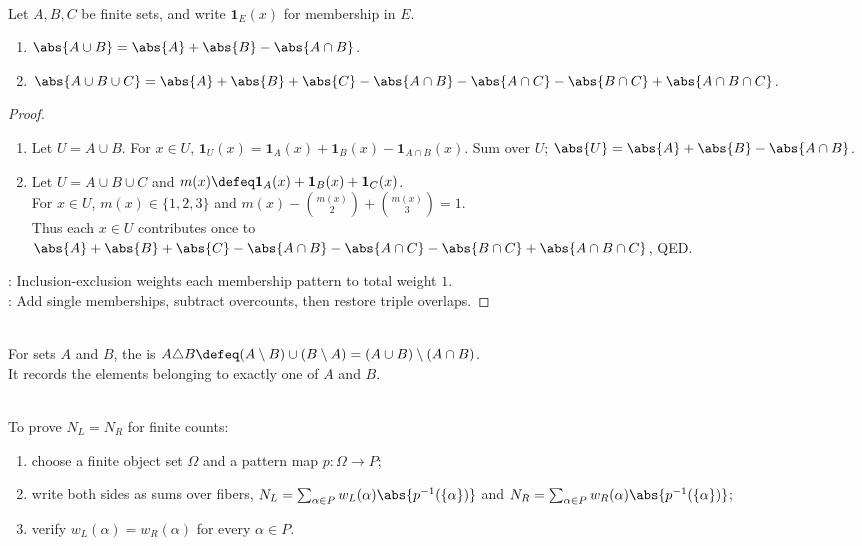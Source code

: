 \begin{proposition} \label{prop:finite-inclusion-exclusion-two-three-sets} \\
Let $A,B,C$ be finite sets, and write $\mathbf{1}_E(x)$ for membership in $E$.
\begin{enumerate}[label=(\roman*)]
\setlength{\itemsep}{0pt}
\item $\abs{A\cup B}=\abs{A}+\abs{B}-\abs{A\cap B}$.
\item $\abs{A\cup B\cup C}=\abs{A}+\abs{B}+\abs{C}-\abs{A\cap B}-\abs{A\cap C}-\abs{B\cap C}+\abs{A\cap B\cap C}$.
\end{enumerate}
\begin{proof}
\begin{enumerate}[label=(\roman*)]
\setlength{\itemsep}{0pt}
\item Let $U=A\cup B$. For $x\in U$, $\mathbf{1}_U(x)=\mathbf{1}_A(x)+\mathbf{1}_B(x)-\mathbf{1}_{A\cap B}(x)$. Sum over $U$; $\abs{U}=\abs{A}+\abs{B}-\abs{A\cap B}$.
\item Let $U=A\cup B\cup C$ and $m(x)\defeq\mathbf{1}_A(x)+\mathbf{1}_B(x)+\mathbf{1}_C(x)$.\\
For $x\in U$, $m(x)\in\{1,2,3\}$ and $m(x)-\binom{m(x)}{2}+\binom{m(x)}{3}=1$.\\
Thus each $x\in U$ contributes once to $\abs{A}+\abs{B}+\abs{C}-\abs{A\cap B}-\abs{A\cap C}-\abs{B\cap C}+\abs{A\cap B\cap C}$, QED.
\end{enumerate}
: Inclusion-exclusion weights each membership pattern to total weight $1$.\\
: Add single memberships, subtract overcounts, then restore triple overlaps.
\end{proof}
\end{proposition}

\begin{definition} \label{def:symmetric-difference-of-events-and-sets} \\
For sets $A$ and $B$, the  is $A\triangle B\defeq (A\setminus B)\cup(B\setminus A)=(A\cup B)\setminus(A\cap B)$.\\
It records the elements belonging to exactly one of $A$ and $B$.
\end{definition}

\begin{method} \label{meth:combinatorial-proof-by-classification} \\
To prove $N_L=N_R$ for finite counts:
\begin{enumerate}[label=(\roman*)]
\setlength{\itemsep}{0pt}
\item choose a finite object set $\Omega$ and a pattern map $p:\Omega\to P$;
\item write both sides as sums over fibers, $N_L=\sum_{\alpha\in P}w_L(\alpha)\abs{p^{-1}(\{\alpha\})}$ and $N_R=\sum_{\alpha\in P}w_R(\alpha)\abs{p^{-1}(\{\alpha\})}$;
\item verify $w_L(\alpha)=w_R(\alpha)$ for every $\alpha\in P$.
\end{enumerate}
\end{method}
